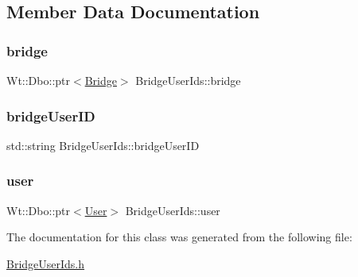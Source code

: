 \subsection{Member Data Documentation}
\mbox{\label{class_bridge_user_ids_acc206990c5f8a7faa8aa5d90c202b31a}} 
\subsubsection{\texorpdfstring{bridge}{bridge}}
{\footnotesize\ttfamily Wt\+::\+Dbo\+::ptr$<$\hyperlink{class_bridge}{Bridge}$>$ Bridge\+User\+Ids\+::bridge}

\mbox{\label{class_bridge_user_ids_ae44d7688638178ed7ba299ca9687cbb5}} 
\subsubsection{\texorpdfstring{bridge\+User\+ID}{bridgeUserID}}
{\footnotesize\ttfamily std\+::string Bridge\+User\+Ids\+::bridge\+User\+ID}

\mbox{\label{class_bridge_user_ids_ab8cf148abfa077eb56c62576386dcffc}} 
\subsubsection{\texorpdfstring{user}{user}}
{\footnotesize\ttfamily Wt\+::\+Dbo\+::ptr$<$\hyperlink{class_user}{User}$>$ Bridge\+User\+Ids\+::user}



The documentation for this class was generated from the following file\+:\begin{DoxyCompactItemize}
\item 
\hyperlink{_bridge_user_ids_8h}{Bridge\+User\+Ids.\+h}\end{DoxyCompactItemize}
